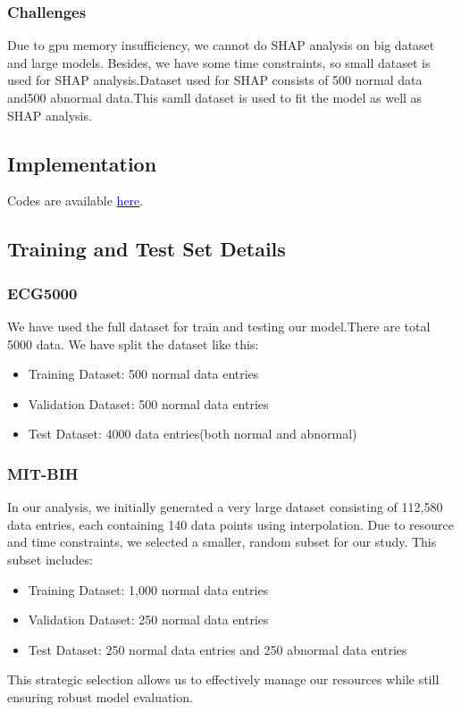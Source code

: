 \documentclass[nonacm,sigconf]{acmart}
\begin{document}
\subsubsection{\textbf{Challenges}}
Due to gpu memory insufficiency, we cannot do SHAP analysis on big dataset and large models. Besides, we have some time constraints, so small dataset is used for SHAP analysis.Dataset used for SHAP consists of 500 normal data and500 abnormal data.This samll dataset is used to fit the model as well as SHAP analysis.

\subsection{Implementation}
Codes are available \href{https://github.com/1905046-NiazRahman/CSE472-Project}{\textcolor{blue}{here}}.


\subsection{Training and Test Set Details}
\subsubsection{\textbf{ECG5000}}
We have used the full dataset for train and testing our model.There are total 5000 data. We have split the dataset like this:
\begin{itemize}
    \item Training Dataset: 500 normal data entries
    \item Validation Dataset: 500 normal data entries
    \item Test Dataset: 4000 data entries(both normal and abnormal)
\end{itemize}
\subsubsection{\textbf{MIT-BIH}}
In our analysis, we initially generated a very large dataset consisting of 112,580 data entries, each containing 140 data points using interpolation. Due to resource and time constraints, we selected a smaller, random subset for our study. This subset includes:
\begin{itemize}
    \item Training Dataset: 1,000 normal data entries
    \item Validation Dataset: 250 normal data entries
    \item Test Dataset: 250 normal data entries and 250 abnormal data entries
\end{itemize}
This strategic selection allows us to effectively manage our resources while still ensuring robust model evaluation.
\end{document}

